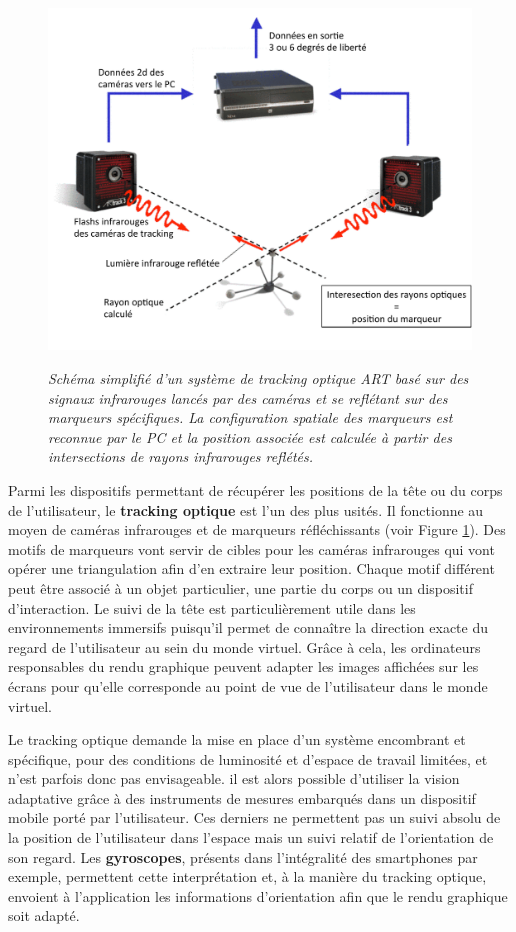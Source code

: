\begin{figure}[htb]
  \centering
  {\includegraphics[width=.65\linewidth]{./figures/ch2/IR-tracking}}
    \caption[Schéma simplifié d'un système de tracking optique.]{{\it Schéma simplifié d'un système de tracking optique ART basé sur des signaux infrarouges lancés par des caméras et se reflétant sur des marqueurs spécifiques. La configuration spatiale des marqueurs est reconnue par le PC et la position associée est calculée à partir des intersections de rayons infrarouges reflétés.}}
  \label{Fig:ir-tracking}
  \hspace{0.3cm}
\end{figure}

Parmi les dispositifs permettant de récupérer les positions de la tête ou du corps de l'utilisateur, le \textbf{tracking optique} est l'un des plus usités. Il fonctionne au moyen de caméras infrarouges et de marqueurs réfléchissants (voir Figure \ref{Fig:ir-tracking}). Des motifs de marqueurs vont servir de cibles pour les caméras infrarouges qui vont opérer une triangulation afin d'en extraire leur position. Chaque motif différent peut être associé à un objet particulier, une partie du corps ou un dispositif d'interaction. Le suivi de la tête est particulièrement utile dans les environnements immersifs puisqu'il permet de connaître la direction exacte du regard de l'utilisateur au sein du monde virtuel. Grâce à cela, les ordinateurs responsables du rendu graphique peuvent adapter les images affichées sur les écrans pour qu'elle corresponde au point de vue de l'utilisateur dans le monde virtuel.

Le tracking optique demande la mise en place d'un système encombrant et spécifique, pour des conditions de luminosité et d'espace de travail limitées, et n'est parfois donc pas envisageable. il est alors possible d'utiliser la vision adaptative grâce à des instruments de mesures embarqués dans un dispositif mobile porté par l'utilisateur. Ces derniers ne permettent pas un suivi absolu de la position de l'utilisateur dans l'espace mais un suivi relatif de l'orientation de son regard. Les \textbf{gyroscopes}, présents dans l'intégralité des smartphones par exemple, permettent cette interprétation et, à la manière du tracking optique, envoient à l'application les informations d'orientation afin que le rendu graphique soit adapté.

